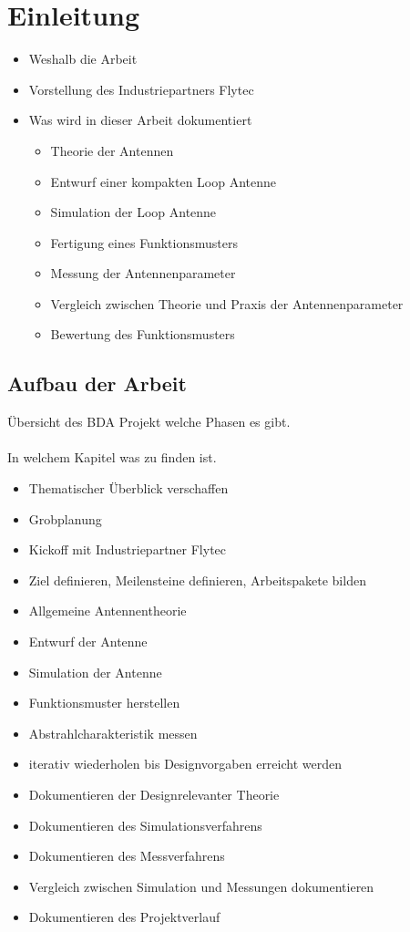 \section{Einleitung}
\begin{itemize}
\item Weshalb die Arbeit
\item Vorstellung des Industriepartners Flytec
\item Was wird in dieser Arbeit dokumentiert
	\begin{itemize}
		\item Theorie der Antennen
		\item Entwurf einer kompakten Loop Antenne
		\item Simulation der Loop Antenne
		\item Fertigung eines Funktionsmusters
		\item Messung der Antennenparameter
		\item Vergleich zwischen Theorie und Praxis der Antennenparameter
		\item Bewertung des Funktionsmusters
	\end{itemize}
\end{itemize}
\subsection{Aufbau der Arbeit}
Übersicht des BDA Projekt welche Phasen es gibt.\\
\\
In welchem Kapitel was zu finden ist.\\
\begin{itemize}
\item Thematischer Überblick verschaffen
\item Grobplanung
\item Kickoff mit Industriepartner Flytec
\item Ziel definieren, Meilensteine definieren, Arbeitspakete bilden
\item Allgemeine Antennentheorie
\item Entwurf der Antenne
\item Simulation der Antenne
\item Funktionsmuster herstellen
\item Abstrahlcharakteristik messen
\item iterativ wiederholen bis Designvorgaben erreicht werden
\item Dokumentieren der Designrelevanter Theorie

\item Dokumentieren des Simulationsverfahrens
\item Dokumentieren des Messverfahrens
\item Vergleich zwischen Simulation und Messungen dokumentieren
\item Dokumentieren des Projektverlauf
\end{itemize}

